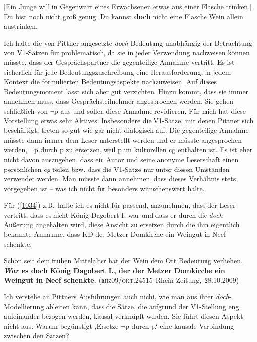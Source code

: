 \begin{exe}
	\ex\label{1033} 
	[Ein Junge will in Gegenwart eines Erwachsenen etwas aus einer Flasche trinken.]
	Du bist noch nicht groß genug. Du kannst \textbf{doch} nicht eine Flasche Wein allein austrinken.			
	\hfill\hbox{\citet[168]{Pittner2011}}
\end{exe}
Ich halte die von Pittner angesetzte \textit{doch}-Bedeutung unabhängig der Betrachtung von V1-Sätzen für problematisch, da sie in jeder Verwendung nachweisen können müsste, dass der Gesprächspartner die gegenteilige Annahme vertritt. Es ist sicherlich für jede Bedeutungszuschreibung eine Herausforderung, in jedem Kontext die formulierten Bedeutungsaspekte nachzuweisen. Auf dieses Bedeutungsmoment lässt sich aber gut verzichten. Hinzu kommt, dass sie immer annehmen muss, dass Gesprächsteilnehmer angesprochen werden. Sie gehen schließlich von $\neg$p aus und sollen diese Annahme revidieren. Für mich hat diese Vorstellung etwas sehr Aktives. Insbesondere die V1-Sätze, mit denen Pittner sich beschäftigt, treten so gut wie gar nicht dialogisch auf. Die gegenteilige Annahme müsste dann immer dem Leser unterstellt werden und er müsste angesprochen werden, $\neg$p durch p zu ersetzen, weil p im kulturellen cg enthalten ist. Es ist eher nicht davon auszugehen, dass ein Autor und seine anonyme Leserschaft einen persönlichen cg teilen bzw. dass die V1-Sätze nur unter diesen Umständen verwendet werden. Man müsste dann annehmen, dass dieses Verhältnis stets vorgegeben ist – was ich nicht für besonders wünschenswert halte.

Für (\ref{1034}) z.B.\ halte ich es nicht für passend, anzunehmen, dass der Leser vertritt, dass es nicht König Dagobert I. war und dass er durch die \textit{doch}-Äußerung angehalten wird, diese Ansicht zu ersetzen durch die ihm eigentlich bekannte Annahme, dass KD der Metzer Domkirche ein Weingut in Neef schenkte.

\begin{exe}
	\ex\label{1034}
	Schon seit dem frühen Mittelalter hat der Wein dem Ort Bedeutung verliehen. \textbf{\textit{War} es \ul{doch} König Dagobert I., der der Metzer 		Domkirche ein Weingut in Neef schenkte.}    
	\hfill\hbox{(\textsc{rhz09/okt.24515} Rhein-Zeitung, 28.10.2009)}
\end{exe}
Ich verstehe an Pittners Ausführungen auch nicht, wie man aus ihrer \textit{doch}-Model\-lierung ableiten kann, dass die Sätze, die aufgrund der V1-Stellung eng aufeinander bezogen werden, kausal verknüpft werden. Sie führt diesen Aspekt nicht aus. Warum begünstigt ‚Ersetze $\neg$p durch p.‘ eine kausale Verbindung zwischen den Sätzen?

